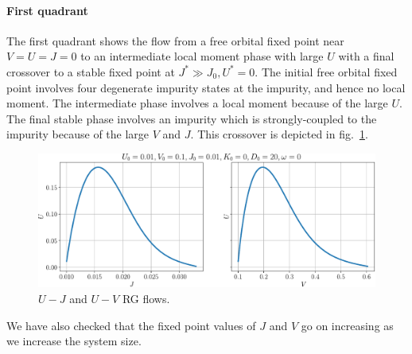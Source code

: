 \documentclass[twoside]{report}
\numberwithin{equation}{section}
\begin{document}
\paragraph*{First quadrant}
The first quadrant shows the flow from a free orbital fixed point near \(V=U=J=0\) to an intermediate local moment phase with large \(U\) with a final crossover to a stable fixed point at \(J^* \gg J_0, U^*=0\). The initial free orbital fixed point involves four degenerate impurity states at the impurity, and hence no local moment. The intermediate phase involves a local moment because of the large \(U\). The final stable phase involves an impurity which is strongly-coupled to the impurity because of the large \(V\) and \(J\). This crossover is depicted in fig.~\ref{crossover}.


\begin{figure}[htpb]
	\centering
	\includegraphics[width=\textwidth]{../figures/crossovers_new.pdf}
	\caption{\(U-J\) and \(U-V\) RG flows.}
	\label{crossover}
\end{figure}

We have also checked that the fixed point values of \(J\) and \(V\) go on increasing as we increase the system size.
\end{document}
